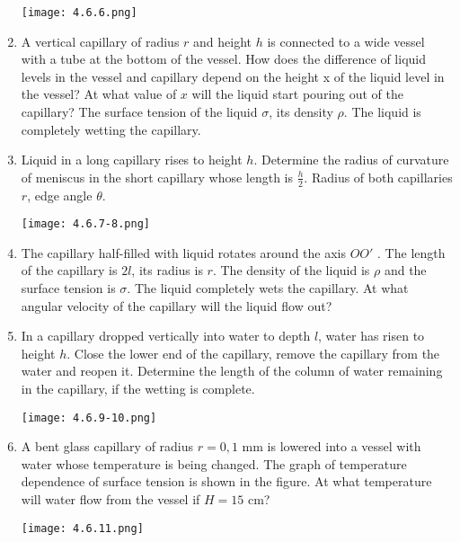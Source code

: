 \documentclass{article}
\begin{document}
\begin{enumerate}[label=4.6.\arabic*]
\begin{center}
    \texttt{[image: 4.6.6.png]}
\end{center}

\item A vertical capillary of radius $r$ and height $h$ is connected to a wide vessel with a tube at the bottom of the vessel. How does the difference of liquid levels in the vessel and capillary depend on the height x of the liquid level in the vessel? At what value of $x$ will the liquid start pouring out of the capillary? The surface tension of the liquid $\sigma$, its density $\rho$. The liquid is completely wetting the capillary.

\item Liquid in a long capillary rises to height $h$. Determine the radius of curvature of meniscus in the short capillary whose length is $\frac{h}{2}$. Radius of both capillaries $r$, edge angle $\theta$. 

\begin{center}
    \texttt{[image: 4.6.7-8.png]}
\end{center}

\item The capillary half-filled with liquid rotates around the axis $OO'$ . The length of the capillary is $2l$, its radius is $r$. The density of the liquid is $\rho$ and the surface tension is $\sigma$. The liquid completely wets the capillary. At what angular velocity of the capillary will the liquid flow out?   

\item In a capillary dropped vertically into water to depth $l$, water has risen to height $h$. Close the lower end of the capillary, remove the capillary from the water and reopen it. Determine the length of the column of water remaining in the capillary, if the wetting is complete.   

\begin{center}
    \texttt{[image: 4.6.9-10.png]}
\end{center}

\item A bent glass capillary of radius $r = 0, 1$ mm is lowered into a vessel with water whose temperature is being changed. The graph of temperature dependence of surface tension is shown in the figure. At what temperature will water flow from the vessel if $H = 15$ cm?

\begin{center}
    \texttt{[image: 4.6.11.png]}
\end{center}


\end{enumerate}
\end{document}

